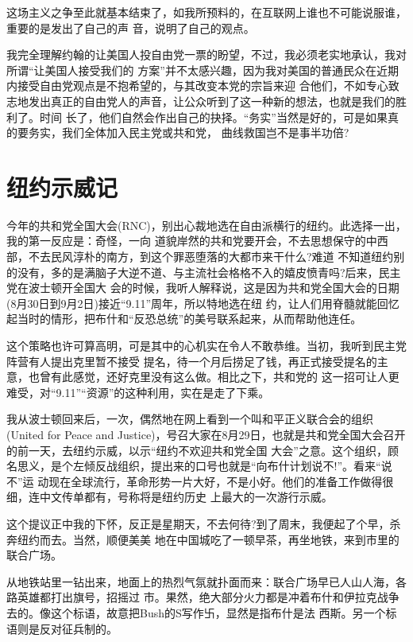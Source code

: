 ﻿\documentclass[11pt]{article}
\begin{document}
这场主义之争至此就基本结束了，如我所预料的，在互联网上谁也不可能说服谁，重要的是发出了自己的声
音，说明了自己的观点。

我完全理解约翰的让美国人投自由党一票的盼望，不过，我必须老实地承认，我对所谓``让美国人接受我们的
方案''并不太感兴趣，因为我对美国的普通民众在近期内接受自由党观点是不抱希望的，与其改变本党的宗旨来迎
合他们，不如专心致志地发出真正的自由党人的声音，让公众听到了这一种新的想法，也就是我们的胜利了。时间
长了，他们自然会作出自己的抉择。``务实''当然是好的，可是如果真的要务实，我们全体加入民主党或共和党，
曲线救国岂不是事半功倍?

\section{纽约示威记}

今年的共和党全国大会(RNC)，别出心裁地选在自由派横行的纽约。此选择一出，我的第一反应是：奇怪，一向
道貌岸然的共和党要开会，不去思想保守的中西部，不去民风淳朴的南方，到这个罪恶堕落的大都市来干什么?难道
不知道纽约别的没有，多的是满脑子大逆不道、与主流社会格格不入的嬉皮愤青吗?后来，民主党在波士顿开全国大
会的时候，我听人解释说，这是因为共和党全国大会的日期(8月30日到9月2日)接近``9.11''周年，所以特地选在纽
约，让人们用脊髓就能回忆起当时的情形，把布什和``反恐总统''的美号联系起来，从而帮助他连任。

这个策略也许可算高明，可是其中的心机实在令人不敢恭维。当初，我听到民主党阵营有人提出克里暂不接受
提名，待一个月后捞足了钱，再正式接受提名的主意，也曾有此感觉，还好克里没有这么做。相比之下，共和党的
这一招可让人更难受，对``9.11''``资源''的这种利用，实在是走了下乘。

我从波士顿回来后，一次，偶然地在网上看到一个叫和平正义联合会的组织(United for Peace and
Justice)，号召大家在8月29日，也就是共和党全国大会召开的前一天，去纽约示威，以示``纽约不欢迎共和党全国
大会''之意。这个组织，顾名思义，是个左倾反战组织，提出来的口号也就是``向布什计划说不!''。看来``说不''运
动现在全球流行，革命形势一片大好，不是小好。他们的准备工作做得很细，连中文传单都有，号称将是纽约历史
上最大的一次游行示威。

这个提议正中我的下怀，反正是星期天，不去何待?到了周末，我便起了个早，杀奔纽约而去。当然，顺便美美
地在中国城吃了一顿早茶，再坐地铁，来到市里的联合广场。

从地铁站里一钻出来，地面上的热烈气氛就扑面而来：联合广场早已人山人海，各路英雄都打出旗号，招摇过
市。果然，绝大部分火力都是冲着布什和伊拉克战争去的。像这个标语，故意把Bush的S写作卐，显然是指布什是法
西斯。另一个标语则是反对征兵制的。
\end{document}
